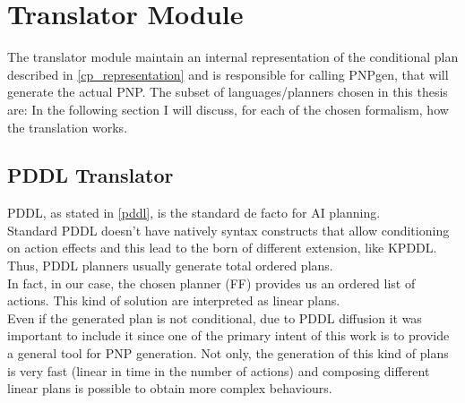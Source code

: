 \documentclass[pdftex,12pt,a4paper]{report}
\begin{document}
\section{Translator Module}
The translator module maintain an internal representation of the conditional plan described in \ref{cp_representation} and is responsible for calling PNPgen, that will generate the actual PNP.
The subset of languages/planners chosen in this thesis are:
In the following section I will discuss, for each of the chosen formalism, how the translation works.  

\newpage
\subsection{PDDL Translator}
PDDL, as stated in \ref{pddl}, is the standard de facto for AI planning. \\
Standard PDDL doesn't have natively syntax constructs that allow conditioning on action effects and this lead to the born of different extension, like KPDDL.
Thus, PDDL planners usually generate total ordered plans.\\ 
In fact, in our case, the chosen planner (FF) provides us an ordered list of actions. This kind of solution are interpreted as linear plans.
\newline 
{}\\
\newline
Even if the generated plan is not conditional, due to PDDL diffusion it was important to include it since one of the primary intent of this work is to provide a general tool for PNP generation. Not only, the generation of this kind of plans is very fast (linear in time in the number of actions) and composing different linear plans is possible to obtain more complex behaviours.
\end{document}
